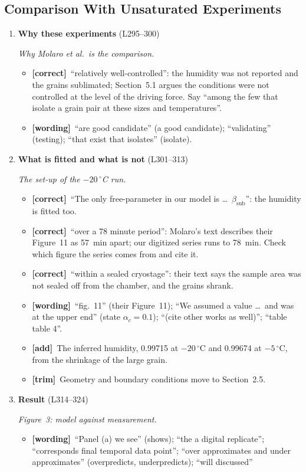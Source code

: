 \documentclass[11pt]{article}
\newcommand{\Pg}[3]{\item \textbf{#1} {\small(#2)}\par\textit{#3}}
\newcommand{\tC}{\textcolor{miss}{\textbf{[correct]}}\ }
\newcommand{\tG}{\textcolor{stale}{\textbf{[wording]}}\ }
\newcommand{\tT}{\textcolor{cut}{\textbf{[trim]}}\ }
\newcommand{\tA}{\textcolor{have}{\textbf{[add]}}\ }
\begin{document}
\subsection{Comparison With Unsaturated Experiments}
\begin{enumerate}
\Pg{Why these experiments}{L295--300}{Why Molaro et al.\ is the comparison.}
  \begin{itemize}
  \item \tC ``relatively well-controlled'': the humidity was not reported
    and the grains sublimated; Section~5.1 argues the conditions were not
    controlled at the level of the driving force. Say ``among the few that
    isolate a grain pair at these sizes and temperatures''.
  \item \tG ``are good candidate'' (a good candidate); ``validating''
    (testing); ``that exist that isolates'' (isolate).
  \end{itemize}
\Pg{What is fitted and what is not}{L301--313}{The set-up of the $-20\,^{\circ}$C run.}
  \begin{itemize}
  \item \tC ``The only free-parameter in our model is \ldots\
    $\beta_{\mathrm{sub}}$'': the humidity is fitted too.
  \item \tC ``over a 78 minute period'': Molaro's text describes their
    Figure~11 as 57~min apart; our digitized series runs to 78~min. Check
    which figure the series comes from and cite it.
  \item \tC ``within a sealed cryostage'': their text says the sample area
    was not sealed off from the chamber, and the grains shrank.
  \item \tG ``fig.~11'' (their Figure~11); ``We assumed a value \ldots\ and
    was at the upper end'' (state $\alpha_c = 0.1$); ``(cite other works as
    well)''; ``table table 4''.
  \item \tA The inferred humidity, 0.99715 at $-20\,^{\circ}$C and 0.99674 at
    $-5\,^{\circ}$C, from the shrinkage of the large grain.
  \item \tT Geometry and boundary conditions move to Section~2.5.
  \end{itemize}
\Pg{Result}{L314--324}{Figure~3: model against measurement.}
  \begin{itemize}
  \item \tG ``Panel (a) we see'' (shows); ``the a digital replicate'';
    ``corresponds final temporal data point''; ``over approximates and
    under approximates'' (overpredicts, underpredicts); ``will discussed''

\end{itemize}
\end{enumerate}
\end{document}
